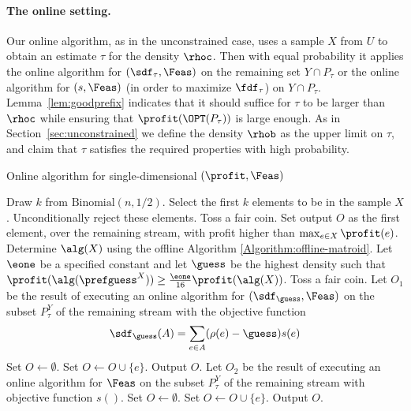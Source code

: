 \paragraph{The online setting.}
Our online algorithm, as in the unconstrained case, uses a sample $X$
from $U$ to obtain an estimate $\tau$ for the density $\rhoc$. Then
with equal probability it applies the online algorithm for
$(\sdf_\tau,\Feas)$ on the remaining set $Y\cap P_\tau$ or the online
algorithm for $(s,\Feas)$ (in order to maximize $\fdf_\tau$) on $Y\cap
P_\tau$. Lemma~\ref{lem:goodprefix} indicates
that it should suffice for $\tau$ to be larger than $\rhoc$ while
ensuring that $\profit(\OPT(P_\tau))$ is large enough. As in
Section~\ref{sec:unconstrained} we define the density $\rhob$ as the
upper limit on $\tau$, and claim that $\tau$ satisfies the required
properties with high probability.

\begin{algorithm}
  \caption{Online algorithm for single-dimensional $(\profit,\Feas)$ }\label{Algorithm:online-matroid}
\begin{algorithmic}[1]
\STATE Draw $k$ from $\textrm{Binomial}(n,1/2)$.  
\STATE Select the first $k$ elements to
be in the sample $X$. Unconditionally reject these elements.  \STATE
Toss a fair coin.   \STATE Set output $O$ as the first
element, over the remaining stream, with profit higher than $\max_{e \in X} \profit(e)$.
\ELSE \STATE Determine $\alg(X)$ using the offline Algorithm
\ref{Algorithm:offline-matroid}.  \STATE Let $\eone$ be a specified
constant and let $\guess$ be the highest density such that
$\profit(\alg(\prefguess^X)) \geq \frac{\eone}{16}\profit(\alg(X))$.
\STATE \label{step:online-start} Toss a fair coin.  
\STATE \label{step:redn-1} Let $O_1$ be the result of executing an
online algorithm for $(\sdf_\guess,\Feas)$ on the subset $P^Y_\tau$ of the remaining
stream with the objective function
\[\sdf_{\guess}(A) = \sum_{e \in A} (\rho(e) - \guess) s(e)\]
\STATE Set $O \leftarrow \emptyset$.   \label{step:for-1}  \STATE Set $O \leftarrow O \cup \{e\}$.  \ENDIF \ENDFOR
\STATE Output $O$.  \ELSE \STATE\label{step:redn-2} Let $O_2$ be the result
of executing an online algorithm for $\Feas$ on the subset $P^Y_\tau$
of the remaining stream with objective function $s()$.  \STATE
Set $O \leftarrow \emptyset$.   \label{step:for-2}
 \STATE Set $O
\leftarrow O \cup \{e\}$.  \ENDIF \ENDFOR
\STATE\label{step:online-end} Output $O$.  \ENDIF \ENDIF
\end{algorithmic}
\end{algorithm}
 
